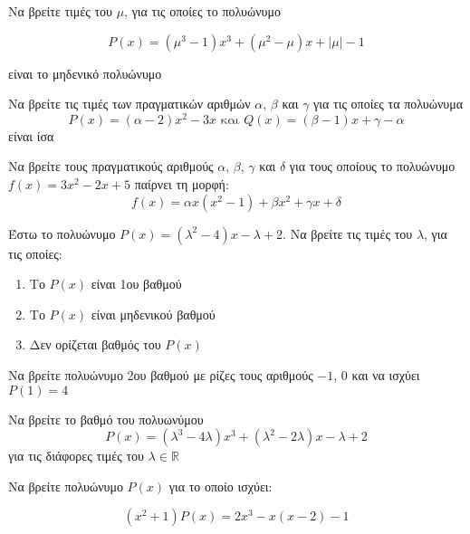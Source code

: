 \documentclass{../presentation}
\begin{document}
\begin{askisi}
  Να βρείτε τιμές του $μ$, για τις οποίες το πολυώνυμο

  $$P(x)=(μ^3-1)x^3+(μ^2-μ)x+|μ|-1$$

  είναι το μηδενικό πολυώνυμο

\end{askisi}

\begin{askisi}
  Να βρείτε τις τιμές των πραγματικών αριθμών $α$, $β$ και $γ$ για τις οποίες τα πολυώνυμα
  $$P(x)=(α-2)x^2-3x \text{ και } Q(x)=(β-1)x+γ-α$$
  είναι ίσα

\end{askisi}

\begin{askisi}
  Να βρείτε τους πραγματικούς αριθμούς $α$, $β$, $γ$ και $δ$ για τους οποίους το πολυώνυμο $f(x)=3x^2-2x+5$ παίρνει τη μορφή:
  $$f(x)=αx(x^2-1)+βx^2+γx+δ$$

\end{askisi}

\begin{askisi}
  Έστω το πολυώνυμο $P(x)=(λ^2-4)x-λ+2$. Να βρείτε τις τιμές του $λ$, για τις οποίες:
  \begin{enumerate}
    \item<1-> Το $P(x)$ είναι 1ου βαθμού
    \item<2-> Το $P(x)$ είναι μηδενικού βαθμού
    \item<3-> Δεν ορίζεται βαθμός του $P(x)$
  \end{enumerate}

\end{askisi}

\begin{askisi}
  Να βρείτε πολυώνυμο 2ου βαθμού με ρίζες τους αριθμούς $-1$, $0$ και να ισχύει $P(1)=4$

\end{askisi}

\begin{askisi}
  Να βρείτε το βαθμό του πολυωνύμου
  $$P(x)=(λ^3-4λ)x^3+(λ^2-2λ)x-λ+2$$
  για τις διάφορες τιμές του $λ\in\mathbb{R}$

\end{askisi}

\begin{askisi}
  Να βρείτε πολυώνυμο $P(x)$ για το οποίο ισχύει:

  $$(x^2+1)P(x)=2x^3-x(x-2)-1$$

\end{askisi}
\end{document}
